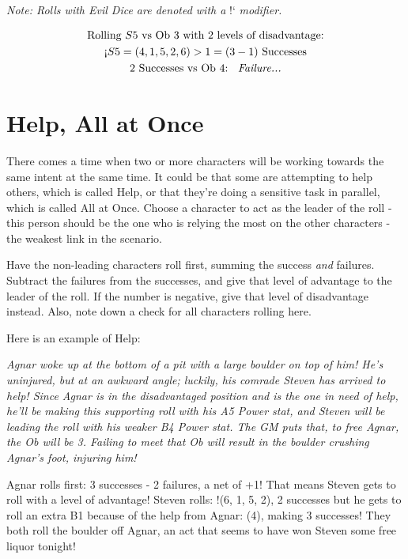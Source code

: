 \documentclass[../main.tex]{subfiles}
\begin{document}
        \emph{Note: Rolls with Evil Dice are denoted with a} !` \emph{modifier.}
        \\
        \begin{mdframed}[style=Arrata]
            \begin{equation*}
                \begin{gathered}
                    \text{Rolling $S5$ vs Ob 3 with 2 levels of disadvantage:}      \\
                    \text{!`}S5 = (4, 1, 5, 2, 6)>1 = (3 - 1) \text{ Successes}     \\
                    2 \text{ Successes vs Ob 4: \emph{ Failure...}}
                \end{gathered}
            \end{equation*}
        \end{mdframed}

    \section{Help, All at Once}

        There comes a time when two or more characters will be working towards the same intent at the same time. It could be that some are attempting to help others, which is called Help, or that they're doing a sensitive task in parallel, which is called All at Once. Choose a character to act as the leader of the roll - this person should be the one who is relying the most on the other characters - the weakest link in the scenario.

        Have the non-leading characters roll first, summing the success {\em and} failures. Subtract the failures from the successes, and give that level of advantage to the leader of the roll. If the number is negative, give that level of disadvantage instead. Also, note down a check for all characters rolling here.

        Here is an example of Help:
        \begin{mdframed}[style=Arrata]
            {\em Agnar woke up at the bottom of a pit with a large boulder on top of him! He's uninjured, but at an awkward angle; luckily, his comrade Steven has arrived to help! Since Agnar is in the disadvantaged position and is the one in need of help, he'll be making this supporting roll with his A5 Power stat, and Steven will be leading the roll with his weaker B4 Power stat. The GM puts that, to free Agnar, the Ob will be 3. Failing to meet that Ob will result in the boulder crushing Agnar's foot, injuring him!

            Agnar rolls first: 3 successes - 2 failures, a net of +1! That means Steven gets to roll with a level of advantage! Steven rolls: !(6, 1, 5, 2), 2 successes but he gets to roll an extra B1 because of the help from Agnar: (4), making 3 successes! They both roll the boulder off Agnar, an act that seems to have won Steven some free liquor tonight!}
        \end{mdframed}
\end{document}
